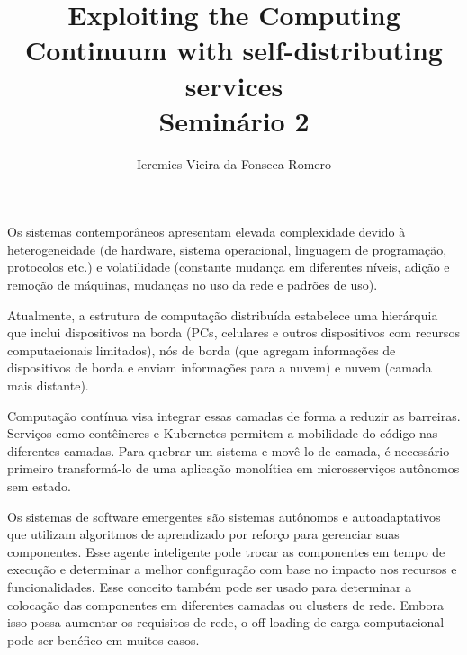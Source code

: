 \documentclass[11pt]{article}
\author{Ieremies Vieira da Fonseca Romero}
\date{}
\title{Exploiting the Computing Continuum with self-distributing services\\\medskip
\large Seminário 2}
\begin{document}
\maketitle
Os sistemas contemporâneos apresentam elevada complexidade devido à heterogeneidade (de hardware, sistema operacional, linguagem de programação, protocolos etc.) e volatilidade (constante mudança em diferentes níveis, adição e remoção de máquinas, mudanças no uso da rede e padrões de uso).

Atualmente, a estrutura de computação distribuída estabelece uma hierárquia que inclui dispositivos na borda (PCs, celulares e outros dispositivos com recursos computacionais limitados), nós de borda (que agregam informações de dispositivos de borda e enviam informações para a nuvem) e nuvem (camada mais distante).

Computação contínua visa integrar essas camadas de forma a reduzir as barreiras.
Serviços como contêineres e Kubernetes permitem a mobilidade do código nas diferentes camadas.
Para quebrar um sistema e movê-lo de camada, é necessário primeiro transformá-lo de uma aplicação monolítica em microsserviços autônomos sem estado.

Os sistemas de software emergentes são sistemas autônomos e autoadaptativos que utilizam algoritmos de aprendizado por reforço para gerenciar suas componentes. Esse agente inteligente pode trocar as componentes em tempo de execução e determinar a melhor configuração com base no impacto nos recursos e funcionalidades. Esse conceito também pode ser usado para determinar a colocação das componentes em diferentes camadas ou clusters de rede. Embora isso possa aumentar os requisitos de rede, o off-loading de carga computacional pode ser benéfico em muitos casos.
\end{document}
